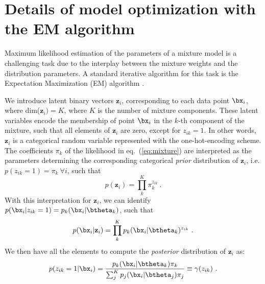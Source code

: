 \section{Details of model optimization with the EM algorithm}
\label{app:EM}

Maximum likelihood estimation of the parameters of a mixture model is a challenging task due to the interplay between the mixture weights and the distribution parameters. 
A standard iterative algorithm for this task is the  Expectation Maximization (EM) algorithm \cite{bishop, hastie2009elements}. 

We introduce latent binary vectors $\textbf{z}_i$, corresponding to each data point $\bx_i$, where dim($\textbf{z}_i)=K$, where $K$ is the number of mixture components. These latent variables encode the membership of point $\bx_i$ in the $k$-th component of the mixture, such that all elements of $\textbf{z}_i$ are zero, except for $z_{ik}=1$. In other words, $\textbf{z}_i$ is a categorical random variable represented with the one-hot-encoding scheme. The coefficients $\pi_k$ of the likelihood in eq.~(\ref{eq:mixture}) are interpreted as the parameters determining the corresponding categorical \textit{prior} distribution of $\textbf{z}_i$, i.e. $p(z_{ik}=1)=\pi_k~\forall i$, such that  
\begin{equation}
 p(\textbf{z}_i) = \prod_k^K \pi_k^{z_{ik}} ~.  
\end{equation}
With this interpretation for $\textbf{z}_i$, we can identify $ p(\bx_i | z_{ik}=1) = p_k(\bx_i|\btheta_k)$, such that
\begin{equation}
p(\bx_i|\textbf{z}_i) = \prod_k^K p_k(\bx_i|\btheta_k)^{z_{ik}}~.
\end{equation}
We then have all the elements to compute the \textit{posterior} distribution of $\textbf{z}_i$ as:
\begin{equation}
p(z_{ik}=1 | \bx_i) = \frac{p_k(\bx_i|\btheta_k) \pi_k}
{\sum_j^K p_j(\bx_i|\btheta_j) \pi_j} \equiv \gamma(z_{ik})~.
\label{gamma}
\end{equation}

